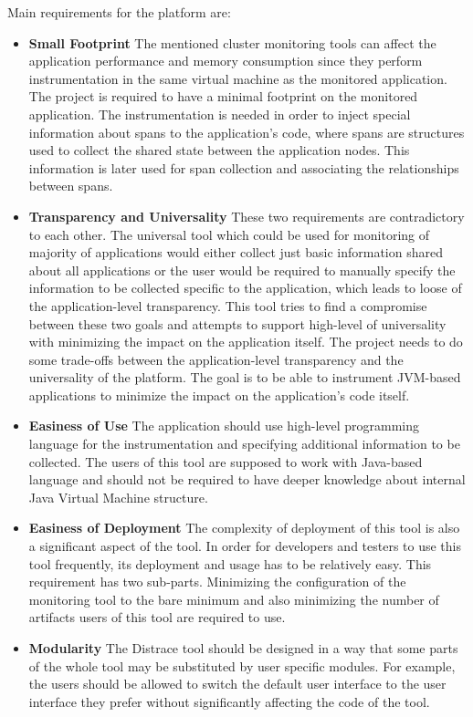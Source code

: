 Main requirements for the platform are:
\begin{itemize}
	\item \textbf{Small Footprint} \newline
	 The mentioned cluster monitoring tools can affect the application performance and memory consumption since they perform instrumentation in the same virtual machine as the monitored application. The project is required to have a minimal footprint on the monitored application. The instrumentation is needed in order to inject special information about spans to the application's code, where spans are structures used to collect the shared state between the application nodes. This information is later used for span collection and associating the relationships between spans.
	\item \textbf{Transparency and Universality} \newline
	These two requirements are contradictory to each other. The universal tool which could be used for monitoring of majority of applications would either collect just basic information shared about all applications or the user would be required to manually specify the information to be collected specific to the application, which leads to loose of the application-level transparency. This tool tries to find a compromise between these two goals and attempts to support high-level of universality with minimizing the impact on the application itself.
	The project needs to do some trade-offs between the application-level transparency and the universality of the platform. The goal is to be able to instrument JVM-based applications to minimize the impact on the application's code itself.
	\item \textbf{Easiness of Use} \newline
	The application should use high-level programming language for the instrumentation and specifying additional information to be collected. The users of this tool are supposed to work with Java-based language and should not be required to have deeper knowledge about internal Java Virtual Machine structure.
	\item \textbf{Easiness of Deployment} \newline
	The complexity of deployment of this tool is also a significant aspect of the tool. In order for developers and testers to use this tool frequently, its deployment and usage has to be relatively easy. This requirement has two sub-parts. Minimizing the configuration of the monitoring tool to the bare minimum and also minimizing the number of artifacts users of this tool are required to use.
	\item \textbf{Modularity} \newline
	The Distrace tool should be designed in a way that some parts of the whole tool may be substituted by user specific modules. For example, the users should be allowed to switch the default user interface to the user interface they prefer without significantly affecting the code of the tool.
\end{itemize}

